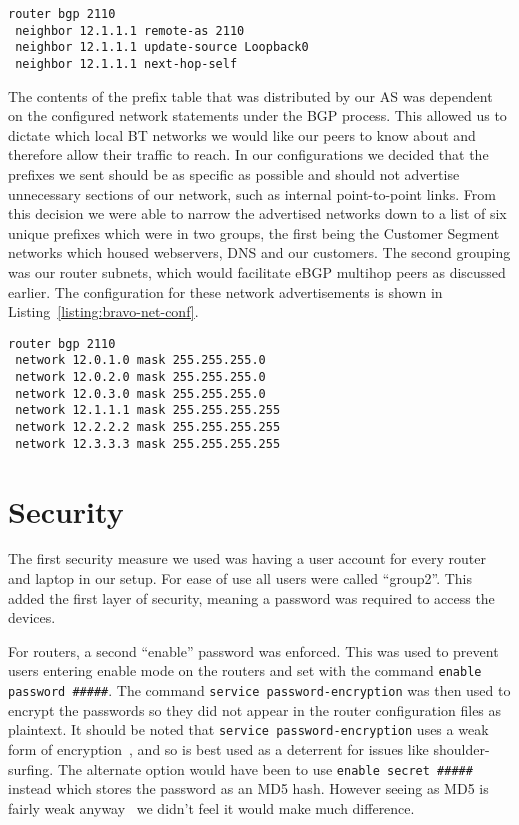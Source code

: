\begin{lstlisting}[caption={Bravo-Alpha iBGP Configuration}, label={listing:bravo-ibgp-conf}]
router bgp 2110
 neighbor 12.1.1.1 remote-as 2110
 neighbor 12.1.1.1 update-source Loopback0
 neighbor 12.1.1.1 next-hop-self
\end{lstlisting}

The contents of the prefix table that was distributed by our AS was dependent
on the configured network statements under the BGP process. This allowed us to
dictate which local BT networks we would like our peers to know about and
therefore allow their traffic to reach. In our configurations we decided that
the prefixes we sent should be as specific as possible and should not advertise
unnecessary sections of our network, such as internal point-to-point links.
From this decision we were able to narrow the advertised networks down to a
list of six unique prefixes which were in two groups, the first being the
Customer Segment networks which housed webservers, DNS and our customers. The
second grouping was our router subnets, which would facilitate eBGP multihop
peers as discussed earlier. The configuration for these network advertisements
is shown in Listing~\ref{listing:bravo-net-conf}.

\begin{lstlisting}[caption={Bravo BGP Network Configuration}, label={listing:bravo-net-conf}]
router bgp 2110
 network 12.0.1.0 mask 255.255.255.0
 network 12.0.2.0 mask 255.255.255.0
 network 12.0.3.0 mask 255.255.255.0
 network 12.1.1.1 mask 255.255.255.255
 network 12.2.2.2 mask 255.255.255.255
 network 12.3.3.3 mask 255.255.255.255
\end{lstlisting}

\section{Security}
The first security measure we used was having a user account for every router
and laptop in our setup. For ease of use all users were called ``group2''. This
added the first layer of security, meaning a password was required to access
the devices.

For routers, a second ``enable'' password was enforced. This was used to
prevent users entering enable mode on the routers and set with the command
\texttt{enable password \#\#\#\#\#}. The command \texttt{service password-encryption}
was then used to encrypt the passwords so they did not appear in
the router configuration files as plaintext. It should be noted that
\texttt{service password-encryption} uses a weak form of
encryption~\cite{ciscocracker}, and so is best used as a deterrent for issues
like shoulder-surfing. The alternate option would have been to use
\texttt{enable secret \#\#\#\#\#} instead which stores the password as an MD5
hash. However seeing as MD5 is fairly weak anyway~\cite{md5} we didn't feel it
would make much difference.

